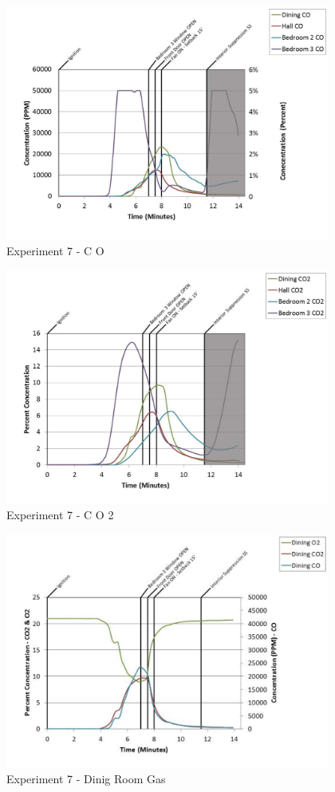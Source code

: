 \documentclass{article}
\begin{document}
\begin{appendices}
	\clearpage

	\begin{figure}[h!]
		\centering
		\includegraphics[height=3.05in]{0_Images/Results_Charts/Exp_7_Charts/CO.pdf}
		\caption{Experiment 7 - C O}
	\end{figure}
 

	\begin{figure}[h!]
		\centering
		\includegraphics[height=3.05in]{0_Images/Results_Charts/Exp_7_Charts/CO2.pdf}
		\caption{Experiment 7 - C O 2}
	\end{figure}
 
	\clearpage

	\begin{figure}[h!]
		\centering
		\includegraphics[height=3.05in]{0_Images/Results_Charts/Exp_7_Charts/DinigRoomGas.pdf}
		\caption{Experiment 7 - Dinig Room Gas}
	\end{figure}
 


\end{appendices}
\end{document}
